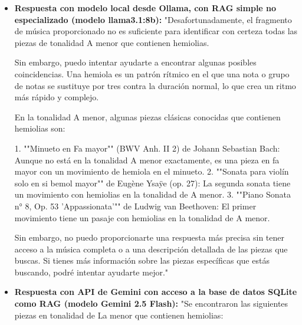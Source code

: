 \begin{itemize}
Estas piezas tienen hemiolias verticales, lo que significa que su estructura armónica incluye patrones de tonos y semitones que se repiten en intervalos de tercera o sexta.
"
\item \textbf{Respuesta con modelo local desde Ollama, con RAG simple no especializado (modelo llama3.1:8b):} "Desafortunadamente, el fragmento de música proporcionado no es suficiente para identificar con certeza todas las piezas de tonalidad A menor que contienen hemiolias.

Sin embargo, puedo intentar ayudarte a encontrar algunas posibles coincidencias. Una hemiola es un patrón rítmico en el que una nota o grupo de notas se sustituye por tres contra la duración normal, lo que crea un ritmo más rápido y complejo.

En la tonalidad A menor, algunas piezas clásicas conocidas que contienen hemiolias son:

1. ""Minueto en Fa mayor"" (BWV  Anh. II 2) de Johann Sebastian Bach: Aunque no está en la tonalidad A menor exactamente, es una pieza en fa mayor con un movimiento de hemiola en el minueto.
2. ""Sonata para violín solo en si bemol mayor"" de Eugène Ysaÿe (op. 27): La segunda sonata tiene un movimiento con hemiolias en la tonalidad de A menor.
3. ""Piano Sonata n° 8, Op. 53 'Appassionata'"" de Ludwig van Beethoven: El primer movimiento tiene un pasaje con hemiolias en la tonalidad de A menor.

Sin embargo, no puedo proporcionarte una respuesta más precisa sin tener acceso a la música completa o a una descripción detallada de las piezas que buscas. Si tienes más información sobre las piezas específicas que estás buscando, podré intentar ayudarte mejor."
\item \textbf{Respuesta con API de Gemini con acceso a la base de datos SQLite como RAG (modelo Gemini 2.5 Flash):} "Se encontraron las siguientes piezas en tonalidad de La menor que contienen hemiolias:


\end{itemize}
